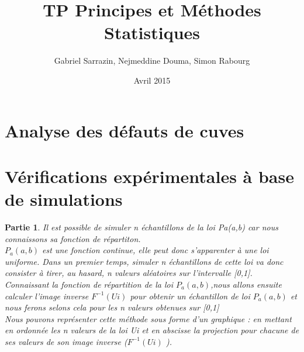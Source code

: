 \documentclass[a4paper,11pt]{article}
\title{TP Principes et M\'{e}thodes Statistiques}
\author{Gabriel Sarrazin, Nejmeddine Douma, Simon Rabourg}
\date{Avril 2015}
\newtheorem{partie}{Partie}
\begin{document}

\maketitle

\section{Analyse des d\'{e}fauts de cuves}


\section{V\'{e}rifications exp\'{e}rimentales \`{a} base de simulations}


\begin{partie}
Il est possible de simuler n \'{e}chantillons de la loi Pa(a,b) car nous connaissons sa fonction de r\'{e}partiton. 
\\
$P_a(a,b)$ est une fonction continue, elle peut donc s'apparenter \`{a} une loi uniforme.  Dans un premier temps, simuler n \'{e}chantillons de cette loi va donc consister  \`{a} tirer, au hasard, n valeurs al\'{e}atoires sur l'intervalle [0,1]. Connaissant la fonction de r\'{e}partition de la loi  $P_a(a,b)$,nous allons ensuite calculer l'image inverse $ F^{-1}(Ui)$ pour obtenir un \'{e}chantillon de loi $P_a(a,b)$ et nous ferons selons cela pour les n valeurs obtenues sur [0,1]
\\
Nous pouvons repr\'{e}senter cette m\'{e}thode sous forme d'un graphique : en mettant en ordonn\'{e}e les n valeurs de la loi Ui et en abscisse la projection pour chacune de ses valeurs de son image inverse ($F^{-1}(Ui)$ ).
\end{partie}
\end{document}
